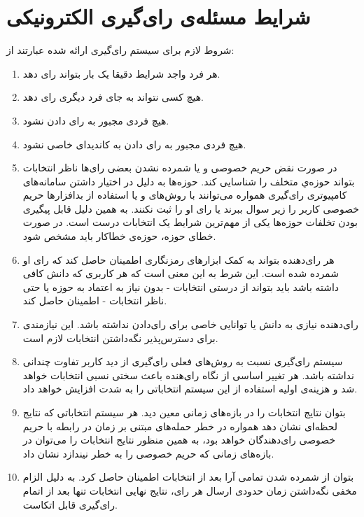 \section{شرایط مسئله‌ی رای‌گیری الکترونیکی}
شروط لازم برای سیستم‌ رای‌گیری ارائه شده عبارتند از:  
\begin{enumerate}
	\item 
	هر فرد واجد شرایط دقیقا یک بار بتواند رای دهد.
	\item 
	هیچ کسی نتواند به جای فرد دیگری رای دهد.
	\item 
	هیچ فردی مجبور به رای دادن نشود.
	\item 
	هیچ فردی مجبور به رای دادن به کاندیدای خاصی نشود.
	\item 
	در صورت نقض حریم خصوصی و یا شمرده نشدن بعضی رای‌ها ناظر انتخابات بتواند حوزه‌ي متخلف را شناسایی کند. حوزه‌ها به دلیل در اختیار داشتن سامانه‌های کامپیوتری رای‌گیری همواره می‌توانند با روش‌های 
	و یا استفاده از بد‌افزار‌ها حریم خصوصی کاربر را زیر سوال ببرند یا رای او را ثبت نکنند. به همین دلیل قابل پیگیری بودن تخلفات حوزه‌ها یکی از مهم‌ترین شرایط یک انتخابات درست است. در صورت خطای حوزه، حوزه‌ی خطاکار باید مشخص شود.
	\item 
	هر رای‌دهنده بتواند به کمک ابزارهای رمزنگاری اطمینان حاصل کند که رای او شمرده شده است. این شرط به این معنی است که هر کاربری که دانش کافی داشته باشد باید بتواند از درستی انتخابات - بدون نیاز به اعتماد به حوزه یا حتی ناظر انتخابات - اطمینان حاصل کند. 
	\item
	رای‌دهنده نیازی به دانش یا توانایی خاصی برای رای‌دادن نداشته باشد. این نیازمندی برای دسترس‌پذیر نگه‌داشتن انتخابات لازم است.
	\item
	سیستم رای‌گیری نسبت به روش‌های فعلی رای‌گیری از دید کاربر تفاوت چندانی نداشته باشد. هر تغییر اساسی از نگاه رای‌هنده باعث سختی نسبی انتخابات خواهد شد و هزینه‌ی اولیه استفاده از این سیستم انتخاباتی را به شدت افزایش خواهد داد.
	\item 
	بتوان نتایج انتخابات را در بازه‌های زمانی معین دید. هر سیستم انتخاباتی که نتایج لحظه‌ای نشان دهد همواره در خطر حمله‌های مبتنی بر زمان در رابطه با حریم خصوصی رای‌دهندگان خواهد بود، به همین منظور نتایج انتخابات را می‌توان در بازه‌های زمانی که حریم خصوصی را به خطر نیندازد نشان داد.
	\item 
	بتوان از شمرده شدن تمامی آرا بعد از انتخابات اطمینان حاصل کرد. به دلیل الزام مخفی نگه‌داشتن زمان حدودی ارسال هر رای، نتایج نهایی انتخابات تنها بعد از اتمام رای‌گیری قابل اتکاست.
\end{enumerate}

